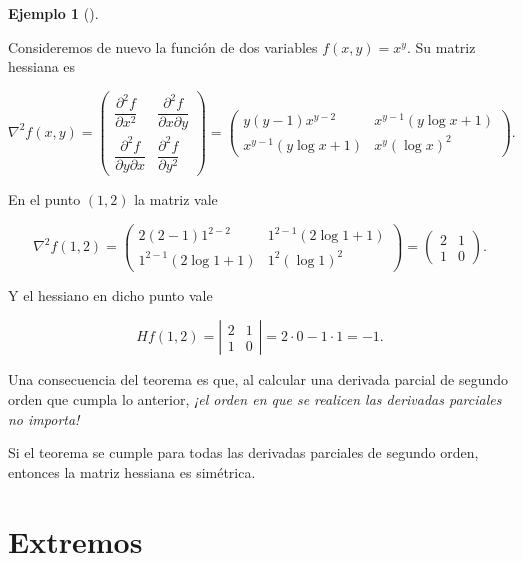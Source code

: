 \documentclass[
  a4paper,
]{scrreport}
\theoremstyle{definition}
\theoremstyle{plain}
\theoremstyle{plain}
\theoremstyle{definition}
\theoremstyle{definition}
\newtheorem{example}{Ejemplo}[chapter]
\theoremstyle{plain}
\theoremstyle{remark}
\begin{document}
\begin{example}[]\protect\hypertarget{exm-matriz-hessiana}{}\label{exm-matriz-hessiana}

Consideremos de nuevo la función de dos variables \(f(x,y)=x^y\). Su
matriz hessiana es

\[\nabla^2f(x,y)=\left(
\begin{array}{cc}
\dfrac{\partial^2 f}{\partial x^2} & \dfrac{\partial^2 f}{\partial x \partial y}\\
\dfrac{\partial^2 f}{\partial y \partial x} & \dfrac{\partial^2 f}{\partial y^2}
\end{array}
\right)
=
\left(
\begin{array}{cc}
y(y-1)x^{y-2} & x^{y-1}(y\log x+1) \\
x^{y-1}(y\log x+1) & x^y(\log x)^2
\end{array}
\right).\]

En el punto \((1,2)\) la matriz vale

\[\nabla^2f(1,2)=\left(
\begin{array}{cc}
2(2-1)1^{2-2} & 1^{2-1}(2\log 1+1) \\
1^{2-1}(2\log 1+1) & 1^2(\log 1)^2
\end{array}
\right)
=
\left(
\begin{array}{cc}
2 & 1 \\
1 & 0
\end{array}
\right).\]

Y el hessiano en dicho punto vale

\[Hf(1,2)=\left|
\begin{array}{cc}
2 & 1 \\
1 & 0
\end{array}
\right|=
2\cdot 0-1\cdot1= -1.
\]

\end{example}

Una consecuencia del teorema es que, al calcular una derivada parcial de
segundo orden que cumpla lo anterior, \emph{¡el orden en que se realicen
las derivadas parciales no importa!}

Si el teorema se cumple para todas las derivadas parciales de segundo
orden, entonces la matriz hessiana es simétrica.

\hypertarget{extremos}{%
\section{Extremos}\label{extremos}}
\end{document}
